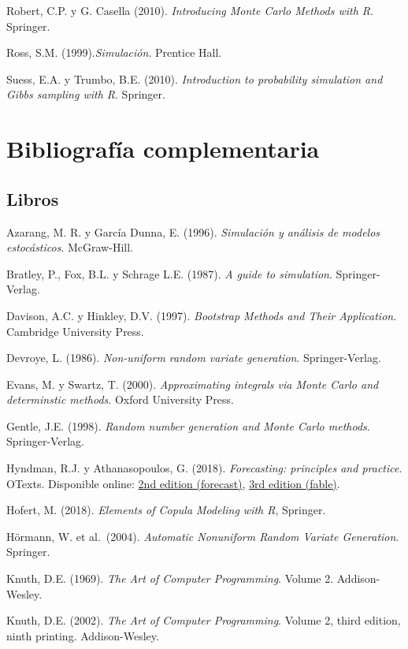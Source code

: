 \documentclass[
]{book}
\theoremstyle{break}
\theoremstyle{nonumberplain}
\begin{document}
Robert, C.P. y G. Casella (2010). \emph{Introducing Monte Carlo Methods with R}. Springer.

Ross, S.M. (1999).\emph{Simulación}. Prentice Hall.

Suess, E.A. y Trumbo, B.E. (2010). \emph{Introduction to probability simulation and Gibbs sampling with R}. Springer.

\hypertarget{bibliografuxeda-complementaria}{%
\section*{Bibliografía complementaria}\label{bibliografuxeda-complementaria}}

\hypertarget{libros}{%
\subsection*{Libros}\label{libros}}

Azarang, M. R. y García Dunna, E. (1996). \emph{Simulación y análisis de modelos estocásticos}. McGraw-Hill.

Bratley, P., Fox, B.L. y Schrage L.E. (1987). \emph{A guide to simulation}. Springer-Verlag.

Davison, A.C. y Hinkley, D.V. (1997). \emph{Bootstrap Methods and Their Application}. Cambridge University Press.

Devroye, L. (1986). \emph{Non-uniform random variate generation}. Springer-Verlag.

Evans, M. y Swartz, T. (2000). \emph{Approximating integrals via Monte Carlo and determinstic methods}. Oxford University Press.

Gentle, J.E. (1998). \emph{Random number generation and Monte Carlo methods}. Springer-Verlag.

Hyndman, R.J. y Athanasopoulos, G. (2018). \emph{Forecasting: principles and practice}. OTexts.
Disponible online: \href{https://otexts.com/fpp2}{2nd edition (forecast)}, \href{https://otexts.com/fpp3}{3rd edition (fable)}.

Hofert, M. (2018). \emph{Elements of Copula Modeling with R}, Springer.

Hörmann, W. et al.~(2004). \emph{Automatic Nonuniform Random Variate Generation}. Springer.

Knuth, D.E. (1969). \emph{The Art of Computer Programming}. Volume 2. Addison-Wesley.

Knuth, D.E. (2002). \emph{The Art of Computer Programming}. Volume 2, third edition, ninth printing. Addison-Wesley.
\end{document}

